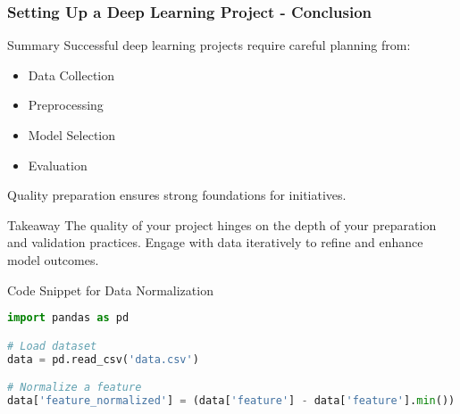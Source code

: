 \documentclass[aspectratio=169]{beamer}
\begin{document}
\begin{frame}[fragile]
    \frametitle{Setting Up a Deep Learning Project - Conclusion}
    \begin{block}{Summary}
        Successful deep learning projects require careful planning from:
        \begin{itemize}
            \item Data Collection
            \item Preprocessing
            \item Model Selection
            \item Evaluation
        \end{itemize}
        Quality preparation ensures strong foundations for initiatives.
    \end{block}
    \begin{block}{Takeaway}
        The quality of your project hinges on the depth of your preparation and validation practices. Engage with data iteratively to refine and enhance model outcomes.
    \end{block}
\end{frame}

\begin{frame}[fragile]{Code Snippet for Data Normalization}
\begin{lstlisting}[language=Python]
import pandas as pd

# Load dataset
data = pd.read_csv('data.csv')

# Normalize a feature
data['feature_normalized'] = (data['feature'] - data['feature'].min()) / (data['feature'].max() - data['feature'].min())
\end{lstlisting}
\end{frame}
\end{document}
